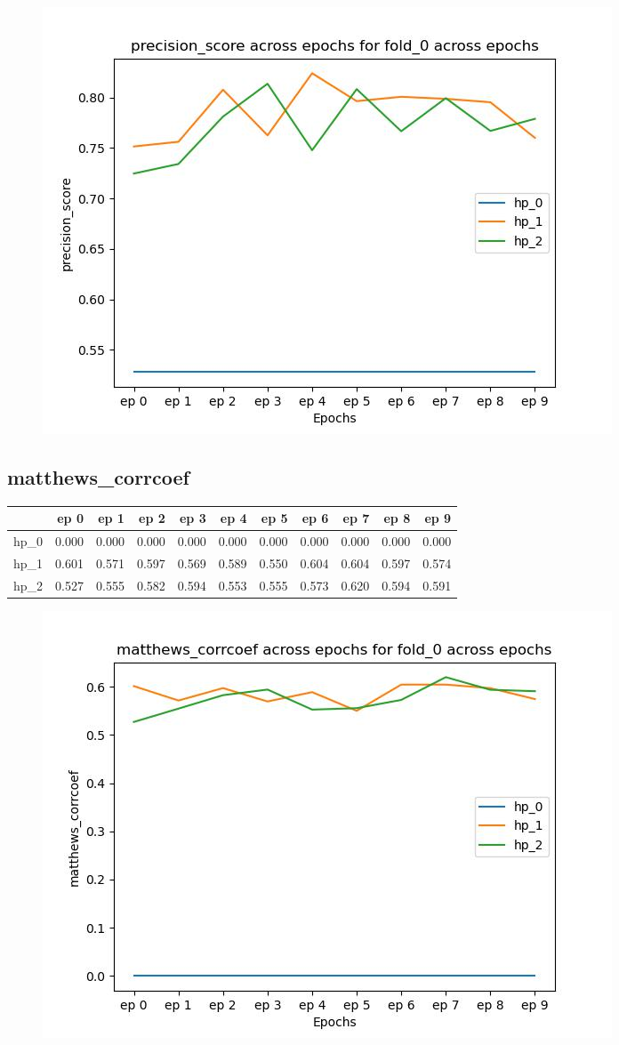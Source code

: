 \documentclass{article}
\begin{document}
\begin{figure}[H]
\includegraphics[scale = 0.75]{fold_0/precision_score}
\end{figure}
\subsection{matthews\_corrcoef}
\begin{tabular}{lrrrrrrrrrr}
\toprule
{} &   ep 0 &   ep 1 &   ep 2 &   ep 3 &   ep 4 &   ep 5 &   ep 6 &   ep 7 &   ep 8 &   ep 9 \\
\midrule
hp\_0 &  0.000 &  0.000 &  0.000 &  0.000 &  0.000 &  0.000 &  0.000 &  0.000 &  0.000 &  0.000 \\
hp\_1 &  0.601 &  0.571 &  0.597 &  0.569 &  0.589 &  0.550 &  0.604 &  0.604 &  0.597 &  0.574 \\
hp\_2 &  0.527 &  0.555 &  0.582 &  0.594 &  0.553 &  0.555 &  0.573 &  0.620 &  0.594 &  0.591 \\
\bottomrule
\end{tabular}

\begin{figure}[H]
\includegraphics[scale = 0.75]{fold_0/matthews_corrcoef}
\end{figure}
\end{document}
